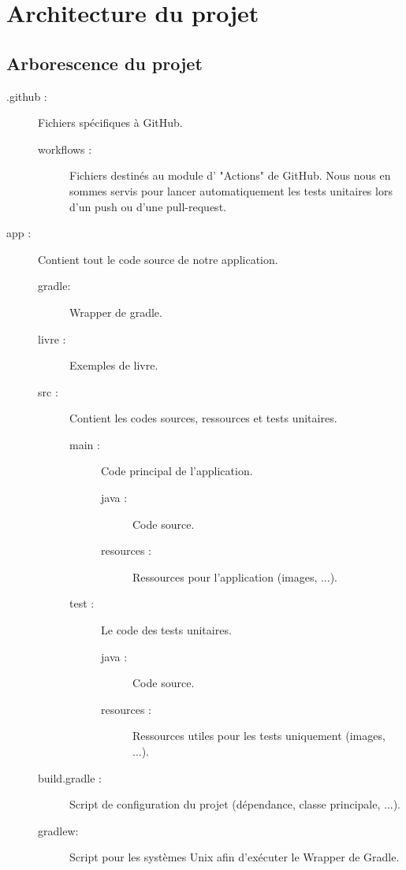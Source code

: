 \chapter{Architecture du projet}

	\section{Arborescence du projet}

		\begin{description}
			\item[.github :]{Fichiers spécifiques à GitHub.}
			\begin{description}
				\item[workflows :]{Fichiers destinés au module d' "Actions" de GitHub. Nous nous en sommes servis pour lancer automatiquement les tests unitaires lors d'un push ou d'une pull-request.}
			\end{description}
			\item[app :]{Contient tout le code source de notre application.}
			\begin{description}
				\item[gradle:]{Wrapper de gradle.}
				\item[livre :]{Exemples de livre.}
				\item[src :]{Contient les codes sources, ressources et tests unitaires.}
				\begin{description}
					\item[main :]{Code principal de l'application.}
					\begin{description}
						\item[java :]{Code source.}
						\item[resources :]{Ressources pour l'application (images, ...).}
					\end{description}
					\item[test :]{Le code des tests unitaires.}
					\begin{description}
						\item[java :]{Code source.}
						\item[resources :]{Ressources utiles pour les tests uniquement (images, ...).}
					\end{description}
				\end{description}
				\item[build.gradle :]{Script de configuration du projet (dépendance, classe principale, ...).}
				\item[gradlew:]{Script pour les systèmes Unix afin d'exécuter le Wrapper de Gradle.}

\end{description}
\end{description}
